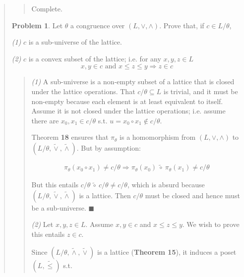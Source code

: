 \documentclass[a4paper, 12pt]{article}
\theoremstyle{definition}
\newtheorem{problem}{Problem}
\theoremstyle{definition}
\theoremstyle{definition}
\begin{document}
\begin{quote}
\small
\begin{quote}


    Complete.


\end{quote}
\normalsize

\begin{problem}
    Let $\theta$ a congruence over $(L, \lor , \land )$. Prove 
    that, if $c \in L / \theta$,

    \textit{(1)} $c$ is a sub-universe of the lattice.

    \textit{(2)} $c$ is a convex subset of the lattice; i.e. for any 
    $x,y,z \in L$ 
    \begin{equation*}
        x,y \in c \text{ and } x \leq z \leq y \Rightarrow z\in c
    \end{equation*}
\end{problem}


\small
\begin{quote}

    \textit{(1)} A sub-universe is a non-empty subset of a lattice that 
    is closed under the lattice operations. That $c / \theta \subseteq L$ 
    is trivial, and it must be non-empty because each element is 
    at least equivalent to itself. Assume it is not closed under 
    the lattice operations; i.e. assume there are $x_0, x_1 \in c /\theta$
    s.t. $u = x_0 \circ x_1 \not\in c / \theta$. 

    Theorem \textbf{18} ensures that $\pi_{\theta}$ is a homomorphism from $(L,
    \lor , \land )$ to $(L / \theta, \widetilde{ \lor  }, \widetilde{ \land  }
    ) $. But by assumption:

    \begin{align*}
        \pi_{\theta}(x_0 \circ x_1) \neq c /\theta \Rightarrow \pi_{\theta}(x_0) ~\widetilde{ \circ } ~ \pi_{\theta}(x_1) \neq c / \theta
    \end{align*}

    But this entails $c / \theta ~ \widetilde{ \circ } ~ c / \theta \neq c / \theta$, 
    which is absurd because $(L / \theta, \widetilde{ \lor  }, \widetilde{
    \land  } ) $ is a lattice. Then $c / \theta$ must be closed and hence must
    be a sub-universe. $\blacksquare$

    \textit{(2)} Let $x, y, z \in L$. Assume $x, y \in c$ and $x \leq z \leq y$.
    We wish to prove this entails $z \in c$.

    Since $(L / \theta, \widetilde{ \land  }, \widetilde{ \lor  })  $ is 
    a lattice (\textbf{Theorem 15}), it induces a poset $(L, \widetilde{ \leq }) $
    s.t. 


\end{quote}
\end{quote}
\end{document}
